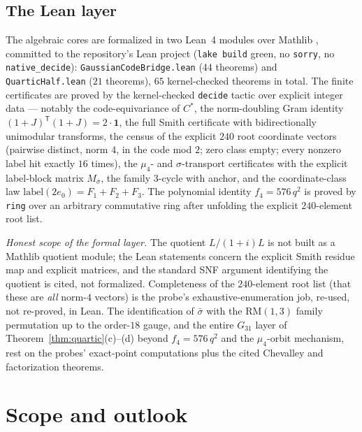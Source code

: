 \documentclass[11pt,a4paper]{article}
\theoremstyle{remark}
\newcommand{\Cst}{C^{*}}
\begin{document}
\subsection{The Lean layer}
The algebraic cores are formalized in two Lean~4 modules over
Mathlib \cite{Moura21,mathlib}, committed to the repository's Lean
project (\texttt{lake build} green, no \texttt{sorry}, no
\texttt{native\_decide}): \texttt{GaussianCodeBridge.lean}
($44$ theorems) and \texttt{QuarticHalf.lean} ($21$ theorems), $65$
kernel-checked theorems in total.  The finite certificates are proved
by the kernel-checked \texttt{decide} tactic over explicit integer
data --- notably the code-equivariance of $\Cst$, the norm-doubling
Gram identity $(1+J)^{\mathsf T}(1+J)=2\cdot\mathbf1$, the full Smith
certificate with bidirectionally unimodular transforms, the census of
the explicit $240$ root coordinate vectors (pairwise distinct, norm
$4$, in the code mod $2$; zero class empty; every nonzero label hit
exactly $16$ times), the $\mu_4$- and $\sigma$-transport certificates
with the explicit label-block matrix $M_{\bar\sigma}$, the family
$3$-cycle with anchor, and the coordinate-class law
$\mathrm{label}(2e_0)=F_1+F_2+F_3$.  The polynomial identity
$f_4=576\,q^2$ is proved by \texttt{ring} over an arbitrary
commutative ring after unfolding the explicit $240$-element root
list.

\emph{Honest scope of the formal layer.}  The quotient $L/(1+i)L$ is
not built as a Mathlib quotient module; the Lean statements concern
the explicit Smith residue map and explicit matrices, and the
standard SNF argument identifying the quotient is cited, not
formalized.  Completeness of the $240$-element root list (that these
are \emph{all} norm-$4$ vectors) is the probe's exhaustive-enumeration
job, re-used, not re-proved, in Lean.  The identification of
$\bar\sigma$ with the $\mathrm{RM}(1,3)$ family permutation up to the
order-$18$ gauge, and the entire $G_{31}$ layer of
Theorem~\ref{thm:quartic}(c)--(d) beyond $f_4=576\,q^2$ and the
$\mu_4$-orbit mechanism, rest on the probes' exact-point
computations plus the cited Chevalley and factorization theorems.

\section{Scope and outlook}\label{sec:scope}
\end{document}
